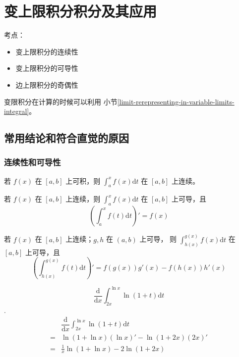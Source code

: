\section{变上限积分积分及其应用}

考点：
\begin{itemize}
    \item 变上限积分的连续性
    \item 变上限积分的可导性
    \item 边上限积分的奇偶性
\end{itemize}

变限积分在计算的时候可以利用 小节\ref{limit-rerepresenting-in-variable-limits-integral}。

\subsection{常用结论和符合直觉的原因}

\subsubsection{连续性和可导性}

\begin{theorem}
    若 $f(x)$ 在 $[a, b]$ 上可积，则 $\int_a^x f(x) \mathrm{d} t$
    在 $[a, b]$ 上连续。
\end{theorem}

\begin{theorem}
    \label{thm:derivative-of-variadict-integral}
    若 $f(x)$ 在 $[a, b]$ 上连续，则 $\int_a^x f(x) \mathrm{d} t$
    在 $[a, b]$ 上可导，且
    \[
        \left(\int_a^x f(t) \mathrm{d}t\right)' = f(x)
    \]
\end{theorem}

\begin{corollary}
    \label{co:derivative-of-variadict-integral-corollary}
    若 $f(x)$ 在 $[a, b]$ 上连续；$g, h$ 在 $(a, b)$ 上可导， 
    则 $\int_{h(x)}^{g(x)} f(x) \mathrm{d} t$
    在 $[a, b]$ 上可导，且
    \[
        \left(\int_{h(x)}^{g(x)} f(t) \mathrm{d}t\right)' = 
        f(g(x))g'(x) - f(h(x))h'(x)
    \]
\end{corollary}

\begin{example}
    \[
        \dfrac{\mathrm d}{\mathrm dx} \int_{2x}^{\ln x} \ln(1+t) \mathrm dt
    \]
    \cite[question 192]{w660}.
    \begin{align*}
        &\dfrac{\mathrm d}{\mathrm dx} \int_{2x}^{\ln x} \ln(1+t) \mathrm dt \\
        =&\ln(1+\ln x)(\ln x)' - \ln(1+2x)(2x)'\\
        =&\frac{1}{x} \ln (1+\ln x) - 2\ln (1+2x)
    \end{align*}
\end{example}

